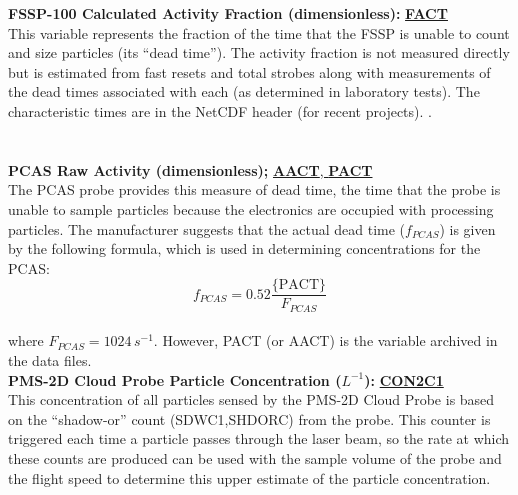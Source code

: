 \begin{hangparagraphs}
\textbf{FSSP-100 Calculated Activity Fraction (dimensionless): }\textbf{\uline{FACT}}\\
This variable represents the fraction of
the time that the FSSP is unable to count and size particles (its
``dead time'').
The activity fraction is not measured directly but is estimated from
fast resets and total strobes along with measurements of the dead
times associated with each (as determined in laboratory tests). The
characteristic times are in the NetCDF header (for recent projects).
.\\
\\
\\


\textbf{PCAS Raw Activity (dimensionless); }\textbf{\uline{AACT}}\uline{,
}\textbf{\uline{PACT}}\\
The PCAS probe provides this measure of dead time, the time that the
probe is unable to sample particles because the electronics are occupied
with processing particles. The manufacturer suggests that the actual
dead time ($f_{PCAS}$) is given by the following formula, which is
used in determining concentrations for the PCAS:\\
\[
f_{PCAS}=0.52\frac{\mathrm{\{PACT\}}}{F_{PCAS}}
\]
\\
where $F_{PCAS}=1024\, s^{-1}$. However, PACT (or AACT) is the variable
archived in the data files. \\


\textbf{PMS-2D Cloud Probe Particle Concentration ($L^{-1}$): }\textbf{\uline{CON2C1}}
\\
This concentration of all particles sensed by the PMS-2D Cloud Probe
is based on the ``shadow-or'' count (SDWC1,SHDORC) from the probe.
This counter is triggered each time a particle passes through the
laser beam, so the rate at which these counts are produced can be
used with the sample volume of the probe and the flight speed to determine
this upper estimate of the particle concentration. \\



\end{hangparagraphs}
